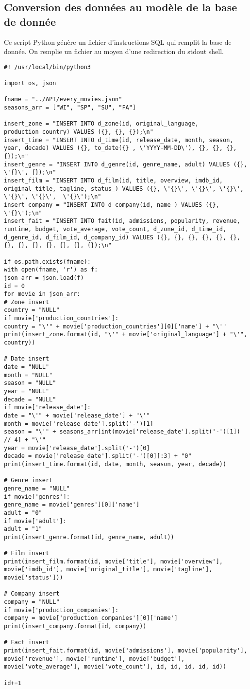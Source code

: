 \subsection{Conversion des données au modèle de la base de donnée }
Ce script Python génère un fichier d'instructions SQL qui remplit la base de donnée.
On remplie un fichier au moyen d'une redirection du stdout shell.
\begin{lstlisting}
#! /usr/local/bin/python3

import os, json

fname = "../API/every_movies.json"
seasons_arr = ["WI", "SP", "SU", "FA"]

insert_zone = "INSERT INTO d_zone(id, original_language, production_country) VALUES ({}, {}, {});\n"
insert_time = "INSERT INTO d_time(id, release_date, month, season, year, decade) VALUES ({}, to_date({} , \'YYYY-MM-DD\'), {}, {}, {}, {});\n"
insert_genre = "INSERT INTO d_genre(id, genre_name, adult) VALUES ({}, \'{}\', {});\n"
insert_film = "INSERT INTO d_film(id, title, overview, imdb_id, original_title, tagline, status_) VALUES ({}, \'{}\', \'{}\', \'{}\', \'{}\', \'{}\',  \'{}\');\n"
insert_company = "INSERT INTO d_company(id, name_) VALUES ({}, \'{}\');\n"
insert_fait = "INSERT INTO fait(id, admissions, popularity, revenue, runtime, budget, vote_average, vote_count, d_zone_id, d_time_id, d_genre_id, d_film_id, d_company_id) VALUES ({}, {}, {}, {}, {}, {}, {}, {}, {}, {}, {}, {}, {});\n"

if os.path.exists(fname):
with open(fname, 'r') as f:
json_arr = json.load(f)
id = 0
for movie in json_arr:
# Zone insert
country = "NULL"
if movie['production_countries']:
country = "\'" + movie['production_countries'][0]['name'] + "\'"
print(insert_zone.format(id, "\'" + movie['original_language'] + "\'", country))

# Date insert
date = "NULL"
month = "NULL"
season = "NULL"
year = "NULL"
decade = "NULL"
if movie['release_date']:
date = "\'" + movie['release_date'] + "\'"
month = movie['release_date'].split('-')[1]
season = "\'" + seasons_arr[int(movie['release_date'].split('-')[1]) // 4] + "\'"
year = movie['release_date'].split('-')[0]
decade = movie['release_date'].split('-')[0][:3] + "0"
print(insert_time.format(id, date, month, season, year, decade))

# Genre insert
genre_name = "NULL"
if movie['genres']:
genre_name = movie['genres'][0]['name']
adult = "0"
if movie['adult']:
adult = "1"
print(insert_genre.format(id, genre_name, adult))

# Film insert
print(insert_film.format(id, movie['title'], movie['overview'], movie['imdb_id'], movie['original_title'], movie['tagline'], movie['status']))

# Company insert
company = "NULL"
if movie['production_companies']:
company = movie['production_companies'][0]['name']
print(insert_company.format(id, company))

# Fact insert
print(insert_fait.format(id, movie['admissions'], movie['popularity'], movie['revenue'], movie['runtime'], movie['budget'], movie['vote_average'], movie['vote_count'], id, id, id, id, id))

id+=1
\end{lstlisting}


